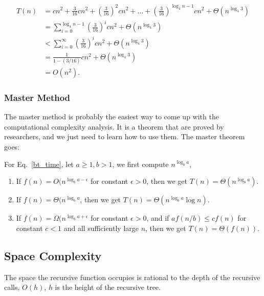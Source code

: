 \documentclass[../algorithms.tex]{subfiles}
\begin{document}
\begin{equation} \label{eg_recurrence_5}
\begin{split}
T(n) & = cn^2+\frac{3}{16}cn^2+(\frac{3}{16})^2cn^2+...+(\frac{3}{16})^{\log_4 {n-1}}cn^2+\Theta(n^{\log_4 3})\\
& = \sum_{i=0}^{\log_4 {n-1}}(\frac{3}{16})^{i}cn^2+\Theta(n^{\log_4 3})\\
&< \sum_{i=0}^{\infty}(\frac{3}{16})^{i}cn^2+\Theta(n^{\log_4 3})\\
& = \frac{1}{1-(3/16)} cn^2+\Theta(n^{\log_4 3})\\
& = O(n^2).
\end{split}
\end{equation}
\subsubsection{Master Method}
The master method is probably the easiest way to come up with the computational complexity analysis. It is a theorem that are proved by researchers, and we just need to learn how to use them. The master theorem goes:

For Eq.~\ref{bt_time}, let $a\geq1, b>1$, we first compute $n^{\log_b a}$, 
\begin{enumerate}
    \item If $f(n) = O(n^{\log_b a - \epsilon}$ for constant $\epsilon>0$, then we get $T(n) = \Theta(n^{\log_b a})$.
    \item If $f(n) = \Theta(n^{\log_b a }$, then we get $T(n) = \Theta(n^{\log_b a} \log n)$.
    \item If $f(n) = \Omega(n^{\log_b a + \epsilon}$ for constant $\epsilon>0$, and if $a f(n/b)\leq cf(n)$ for constant $c<1$ and all sufficiently large $n$, then we get $T(n) = \Theta(f(n))$.
\end{enumerate}
\subsection{Space Complexity}
The space the recursive function occupies is rational to the depth of the recursive calls, $O(h)$, $h$ is the height of the recursive tree.
\end{document}
